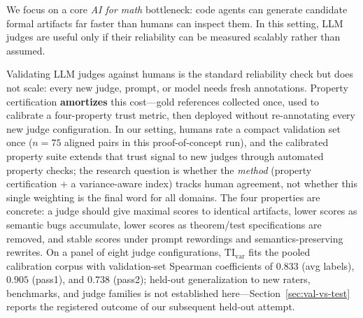 \documentclass{article}
\begin{document}
We focus on a core \emph{AI for math} bottleneck: code agents can generate candidate formal artifacts far faster than humans can inspect them. In this setting, LLM judges are useful only if their reliability can be measured scalably rather than assumed.

Validating LLM judges against humans is the standard reliability check but does not scale: every new judge, prompt, or model needs fresh annotations.
Property certification \textbf{amortizes} this cost---gold references collected once, used to calibrate a four-property trust metric, then deployed without re-annotating every new judge configuration.
In our setting, humans rate a compact validation set once (\(n {=} 75\) aligned pairs in this proof-of-concept run), and the calibrated property suite extends that trust signal to new judges through automated property checks; the research question is whether the \emph{method} (property certification + a variance-aware index) tracks human agreement, not whether this single weighting is the final word for all domains.
The four properties are concrete: a judge should give maximal scores to identical artifacts, lower scores as semantic bugs accumulate, lower scores as theorem/test specifications are removed, and stable scores under prompt rewordings and semantics-preserving rewrites.
On a panel of eight judge configurations, \(\mathrm{TI}_{\mathrm{var}}\) fits the pooled calibration corpus with validation-set Spearman coefficients of \(0.833\) (avg labels), \(0.905\) (pass1), and \(0.738\) (pass2); held-out generalization to new raters, benchmarks, and judge families is not established here---Section~\ref{sec:val-vs-test} reports the registered outcome of our subsequent held-out attempt.
\end{document}
